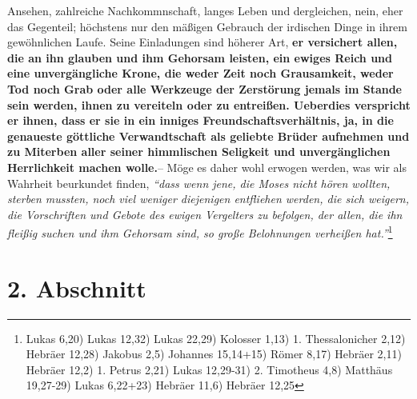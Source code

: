 Ansehen, zahlreiche Nachkommnschaft,
langes Leben und dergleichen, nein, eher das Gegenteil; höchstens nur den
mäßigen Gebrauch der irdischen Dinge in ihrem gewöhnlichen Laufe. Seine
Einladungen sind höherer Art,
\label{ref:16_01_warum_2}
\textbf{er versichert allen, die an ihn glauben und ihm
Gehorsam leisten, ein ewiges Reich und eine unvergängliche
Krone, die weder
Zeit noch Grausamkeit, weder Tod noch Grab oder alle Werkzeuge der Zerstörung
jemals im Stande sein werden, ihnen zu vereiteln oder zu entreißen. Ueberdies
verspricht er ihnen, dass er sie in ein inniges Freundschaftsverhältnis, ja, in
die genaueste göttliche Verwandtschaft als geliebte Brüder aufnehmen und zu
Miterben aller seiner himmlischen Seligkeit und unvergänglichen
Herrlichkeit
machen wolle.}-- Möge es daher wohl erwogen werden, was wir als Wahrheit
beurkundet finden,
\textit{"`dass wenn jene, die Moses nicht hören wollten, sterben
mussten, noch viel weniger diejenigen entfliehen werden, die sich weigern, die
Vorschriften und Gebote des ewigen Vergelters zu befolgen, der allen, die ihn
fleißig suchen und ihm Gehorsam sind, so große Belohnungen verheißen
hat."'}\footnote{
Lukas 6,20)
Lukas 12,32)
Lukas 22,29)
Kolosser 1,13)
1. Thessalonicher 2,12)
Hebräer 12,28)
Jakobus 2,5)
Johannes 15,14+15)
Römer 8,17)
Hebräer 2,11)
Hebräer 12,2)
1. Petrus 2,21)
Lukas 12,29-31)
2. Timotheus 4,8)
Matthäus 19,27-29)
Lukas 6,22+23)
Hebräer 11,6)
Hebräer 12,25}

\section{2. Abschnitt} \label{kap16_ab2}


